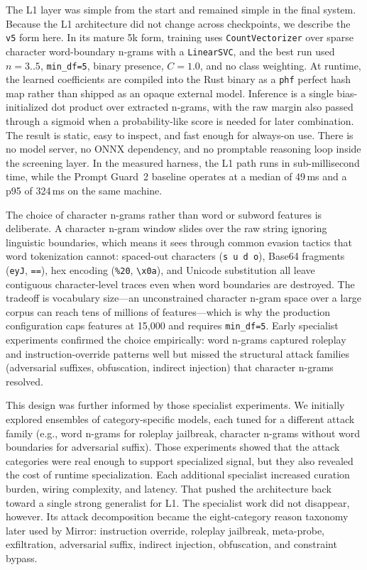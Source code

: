 \documentclass[11pt,a4paper]{article}
\begin{document}
The L1 layer was simple from the start and remained simple in the final
system. Because the L1 architecture did not change across checkpoints,
we describe the \texttt{v5} form here. In its mature 5k form, training
uses \texttt{CountVectorizer} over sparse character word-boundary
n-grams with a \texttt{LinearSVC}, and the best run used $n=3..5$,
\texttt{min\_df=5}, binary presence, $C=1.0$, and no class weighting.
At runtime, the learned coefficients are compiled into the Rust binary
as a \texttt{phf} perfect hash map rather than shipped as an opaque
external model. Inference is a single bias-initialized dot product over
extracted n-grams, with the raw margin also passed through a sigmoid
when a probability-like score is needed for later combination. The
result is static, easy to inspect, and fast enough for always-on use.
There is no model server, no ONNX dependency, and no promptable
reasoning loop inside the screening layer. In the measured harness, the
L1 path runs in sub-millisecond time, while the Prompt Guard~2 baseline
operates at a median of 49\,ms and a p95 of 324\,ms on the same
machine.

The choice of character n-grams rather than word or subword features is
deliberate. A character n-gram window slides over the raw string
ignoring linguistic boundaries, which means it sees through common
evasion tactics that word tokenization cannot: spaced-out characters
(\texttt{s u d o}), Base64 fragments (\texttt{eyJ}, \texttt{==}), hex
encoding (\texttt{\%20}, \texttt{\textbackslash x0a}), and Unicode
substitution all leave contiguous character-level traces even when word
boundaries are destroyed. The tradeoff is vocabulary size---an
unconstrained character n-gram space over a large corpus can reach tens
of millions of features---which is why the production configuration caps
features at 15,000 and requires \texttt{min\_df=5}. Early specialist
experiments confirmed the choice empirically: word n-grams captured
roleplay and instruction-override patterns well but missed the
structural attack families (adversarial suffixes, obfuscation, indirect
injection) that character n-grams resolved.

This design was further informed by those specialist experiments. We
initially explored ensembles of category-specific models, each tuned for
a different attack family (e.g., word n-grams for roleplay jailbreak,
character n-grams without word boundaries for adversarial suffix). Those
experiments showed that the attack categories were real enough to
support specialized signal, but they also revealed the cost of runtime
specialization. Each additional specialist increased curation burden,
wiring complexity, and latency. That pushed the architecture back toward
a single strong generalist for L1. The specialist work did not
disappear, however. Its attack decomposition became the eight-category
reason taxonomy later used by Mirror: instruction override, roleplay
jailbreak, meta-probe, exfiltration, adversarial suffix, indirect
injection, obfuscation, and constraint bypass.
\end{document}
